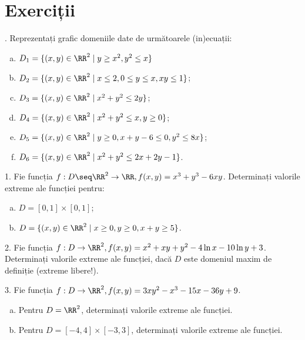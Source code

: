 \section{Exerciții}

\indent{}. Reprezentați grafic domeniile date de următoarele (in)ecuații:
\begin{enumerate}[(a)]
\item $ D_1 = \{ (x, y) \in \RR^2 \mid y \geq x^2, y^2 \leq x \} $
\item $ D_2 = \{ (x, y) \in \RR^2 \mid x \leq 2, 0 \leq y \leq x, xy \leq 1 \} $;
\item $ D_3 = \{ (x, y) \in \RR^2 \mid x^2 + y^2 \leq 2y \} $;
\item $ D_4 = \{ (x, y) \in \RR^2 \mid x^2 + y^2 \leq x, y \geq 0 \} $;
\item $ D_5 = \{ (x, y) \in \RR^2 \mid y \geq 0, x + y - 6 \leq 0, y^2 \leq 8x \} $;
\item $ D_6 = \{ (x, y) \in \RR^2 \mid x^2 + y^2 \leq 2x + 2y - 1 \} $.
\end{enumerate}

\vspace{0.3cm}

1. Fie funcția $ f : D \seq \RR^2 \to \RR, f(x, y) = x^3 + y^3 - 6xy $.
Determinați valorile extreme ale funcției pentru:
\begin{enumerate}[(a)]
\item $ D = [0, 1] \times [0, 1] $;
\item $ D = \{ (x, y) \in \RR^2 \mid x \geq 0, y \geq 0, x + y \geq 5 \} $.
\end{enumerate}

\vspace{0.3cm}

2. Fie funcția $ f : D \to \RR^2, f(x, y) = x^2 + xy + y^2 - 4\ln x - 10\ln y + 3 $.
Determinați valorile extreme ale funcției, dacă $ D $ este domeniul
maxim de definiție (extreme libere!).

\vspace{0.3cm}

3. Fie funcția $ f : D \to \RR^2, f(x, y) = 3xy^2 - x^3 - 15x - 36y + 9 $.
\begin{enumerate}[(a)]
\item Pentru $ D = \RR^2 $, determinați valorile extreme ale funcției.
\item Pentru $ D = [-4, 4] \times [-3, 3] $, determinați valorile
  extreme ale funcției.
\end{enumerate}

